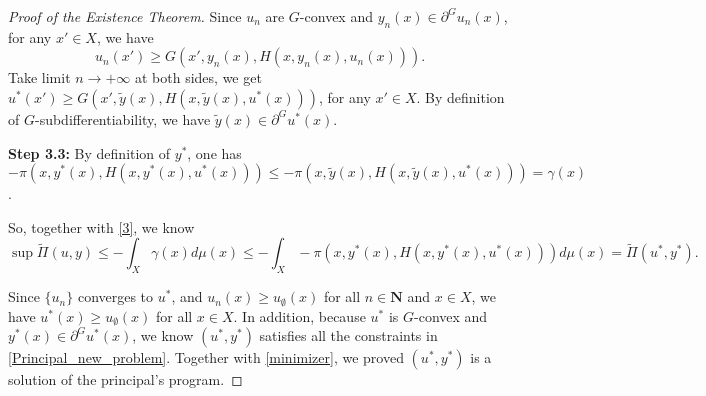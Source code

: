 \documentclass[a4paper, 11pt]{amsart}
\numberwithin{equation}{section}
\theoremstyle{plain}
\theoremstyle{definition}
\theoremstyle{remark}
\newcommand{\N}{\mathbf{N}}
\begin{document}
\begin{proof}[Proof of the Existence Theorem]
Since $u_n$ are $G$-convex and $y_n(x) \in \partial^G u_n(x)$, for any $x' \in X$, we have $$u_n(x')\ge G(x', y_n(x),H(x,y_n(x),u_n(x))).$$ 
Take limit $n\rightarrow +\infty$ at both sides, we get $u^*(x')\ge G(x', \tilde{y}(x),H(x,\tilde{y}(x),u^*(x)))$, for any $x'\in X$. By definition of $G$-subdifferentiability, we have $\tilde{y}(x)\in \partial^Gu^*(x)$. \medskip

{\bf Step 3.3: } By definition of $y^*$, one has $$ -\pi(x, y^*(x), H(x,y^*(x),u^*(x)))\le   -\pi(x, \tilde{y}(x), H(x,\tilde{y}(x),u^*(x))) = \gamma(x)$$.
	
So, together with \eqref{3}, we know 
\begin{equation}\label{minimizer}
	\sup \tilde{\Pi}(u,y) \le - \int_{X}  \gamma(x) d\mu(x) \le - \int_{X}  - \pi(x, y^*(x), H(x,y^*(x),u^*(x))) d\mu(x) = \tilde{\Pi}(u^*,y^*).
\end{equation}


Since $\{u_n\}$ converges to $u^*$, and $u_n(x)\ge u_{\emptyset}(x)$ for all $n\in \N$ and $x \in X$, we have $u^*(x)\ge u_{\emptyset}(x)$ for all $x \in X$. In addition, because $u^*$ is $G$-convex and $y^*(x) \in \partial^G u^*(x)$, we know $(u^*, y^*)$ satisfies all the constraints in \eqref{Principal_new_problem}. Together with \eqref{minimizer}, we proved $(u^*,y^*)$ is a solution of the principal's program.
\end{proof}



\bigskip











\end{document}
